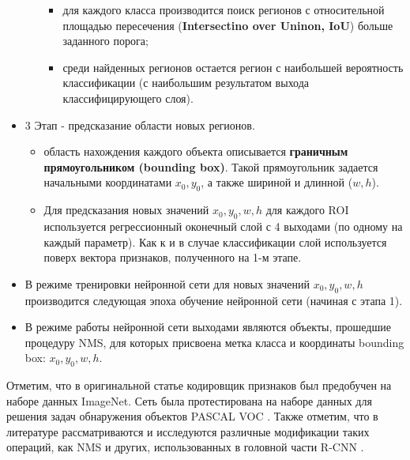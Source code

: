 \documentclass[12pt]{article}
\begin{document}
\begin{sloppypar}
\begin{itemize}
\begin{itemize}
\begin{itemize}
        \item для каждого класса производится поиск регионов с относительной площадью пересечения (\textbf{Intersectino over Uninon, IoU}) больше заданного порога; 
        \item среди найденных регионов остается регион с наибольшей вероятность классификации (с наибольшим результатом выхода классифицирующего слоя).
        \end{itemize}
    \end{itemize}
    \item 3 Этап - предсказание области новых регионов.
    \begin{itemize}\itemsep 0.0em
    \item область нахождения каждого объекта описывается \textbf{граничным прямоугольником (bounding box)}. Такой прямоугольник задается начальными координатами $x_0, y_0$, а также шириной и длинной ($w, h$).
    \item Для предсказания новых значений  $x_0, y_0, w, h$ для каждого ROI используется регрессионный оконечный слой с 4 выходами (по одному на каждый параметр). Как к и в случае классификации слой используется поверх вектора признаков, полученного на 1-м этапе.
    \end{itemize}
    \item В режиме тренировки нейронной сети для новых значений  $x_0, y_0, w, h$ производится следующая эпоха обучение нейронной сети (начиная с этапа 1).
    \item В режиме работы нейронной сети выходами являются объекты, прошедшие процедуру NMS, для которых присвоена метка класса и координаты bounding box: $x_0, y_0, w, h$.
\end{itemize}
Отметим, что в оригинальной статье \cite{girshick2014rich} кодировщик признаков был предобучен на наборе данных ImageNet. Сеть была протестирована на наборе данных для решения задач обнаружения объектов PASCAL VOC \cite{pascalVOC}. Также отметим, что в литературе рассматриваются и исследуются различные модификации таких операций, как NMS и других, использованных в головной части R-CNN \cite{zou2019object}. 


\end{sloppypar}
\end{document}
